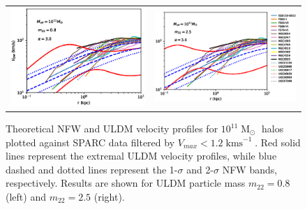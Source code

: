 \documentclass[a4paper,11pt]{article}
\begin{document}
\begin{figure}
\begin{tabular}{cc}
{\includegraphics[scale = 0.65, trim={2.5cm 2.5cm 2.1cm 0.5cm}]{pics/v_11_8_3_paper.eps}} &
{\includegraphics[scale = 0.65, trim={2.1cm 2.5cm 0cm 0.5cm}]{pics/v_11_25_3_paper.eps}}
\end{tabular}
\caption{Theoretical NFW and ULDM velocity profiles for $10^{11}\operatorname{M}_{\odot}$ halos plotted against SPARC data filtered by $V_{max} < 1.2 \operatorname{kms}^{-1}$. Red solid lines represent the extremal ULDM velocity profiles, while  blue dashed and dotted lines represent the 1-$\sigma$ and 2-$\sigma$ NFW bands, respectively. Results are shown for ULDM particle mass $m_{22} = 0.8$ (left) and $m_{22} = 2.5 $ (right).}\label{fig:velocity_11}
\end{figure}
\end{document}
